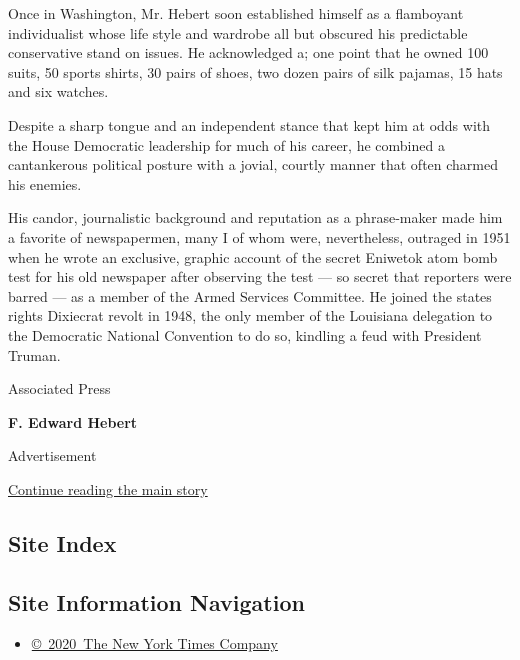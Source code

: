 Once in Washington, Mr. Hebert soon established himself as a flamboyant
individualist whose life style and wardrobe all but obscured his
predictable conservative stand on issues. He acknowledged a; one point
that he owned 100 suits, 50 sports shirts, 30 pairs of shoes, two dozen
pairs of silk pajamas, 15 hats and six watches.

Despite a sharp tongue and an independent stance that kept him at odds
with the House Democratic leadership for much of his career, he combined
a cantankerous political posture with a jovial, courtly manner that
often charmed his enemies.

His candor, journalistic background and reputation as a phrase‐maker
made him a favorite of newspapermen, many I of whom were, nevertheless,
outraged in 1951 when he wrote an exclusive, graphic account of the
secret Eniwetok atom bomb test for his old newspaper after observing the
test --- so secret that reporters were barred --- as a member of the
Armed Services Committee. He joined the states rights Dixiecrat revolt
in 1948, the only member of the Louisiana delegation to the Democratic
National Convention to do so, kindling a feud with President Truman.

Associated Press

\textbf{F. Edward Hebert}

Advertisement

\protect\hyperlink{after-bottom}{Continue reading the main story}

\hypertarget{site-index}{%
\subsection{Site Index}\label{site-index}}

\hypertarget{site-information-navigation}{%
\subsection{Site Information
Navigation}\label{site-information-navigation}}

\begin{itemize}
\tightlist
\item
  \href{https://help.nytimes3xbfgragh.onion/hc/en-us/articles/115014792127-Copyright-notice}{©~2020~The
  New York Times Company}
\end{itemize}

